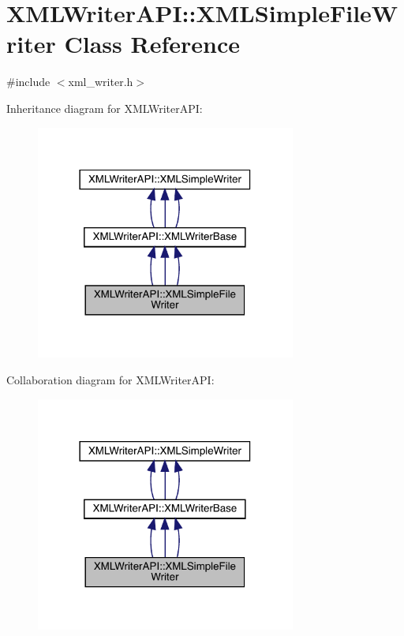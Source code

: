 \hypertarget{classXMLWriterAPI_1_1XMLSimpleFileWriter}{}\section{X\+M\+L\+Writer\+A\+PI\+:\+:X\+M\+L\+Simple\+File\+Writer Class Reference}
\label{classXMLWriterAPI_1_1XMLSimpleFileWriter}


{\ttfamily \#include $<$xml\+\_\+writer.\+h$>$}



Inheritance diagram for X\+M\+L\+Writer\+A\+PI\+:
\nopagebreak
\begin{figure}[H]
\begin{center}
\leavevmode
\includegraphics[width=242pt]{d5/d57/classXMLWriterAPI_1_1XMLSimpleFileWriter__inherit__graph}
\end{center}
\end{figure}


Collaboration diagram for X\+M\+L\+Writer\+A\+PI\+:
\nopagebreak
\begin{figure}[H]
\begin{center}
\leavevmode
\includegraphics[width=242pt]{dc/df8/classXMLWriterAPI_1_1XMLSimpleFileWriter__coll__graph}
\end{center}
\end{figure}
